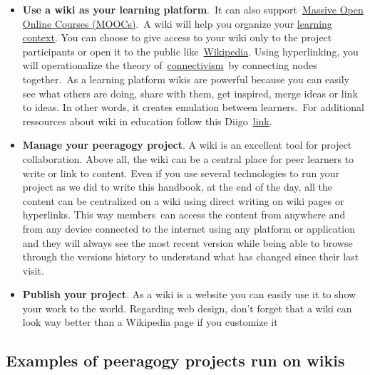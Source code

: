 \begin{itemize}
\item
  \textbf{Use a wiki as your learning platform}.~It can also
  support~\href{http://socialmediaclassroom.com/host/peeragogy/wiki/connectivism-practice-how-organize-a-mooc}{Massive
  Open Online Courses (MOOCs)}.~A wiki will help you organize your
  \href{http://socialmediaclassroom.com/host/peeragogy/wiki/organizing-a-learning-context}{learning
  context}. You can choose to give access to your wiki only to the
  project participants or open it to the public
  like~\href{http://www.wikipedia.org/}{Wikipedia}. Using hyperlinking,
  you will operationalize the theory
  of~\href{http://en.wikipedia.org/wiki/Connectivism}{connectivism}~by
  connecting nodes together.~As a learning platform wikis are powerful
  because you can easily see what others are doing, share with them, get
  inspired, merge ideas or link to ideas. In other words, it creates
  emulation between learners.~For additional ressources about wiki in
  education follow this
  Diigo~\href{http://www.diigo.com/user/regisb/wiki\%20education}{link}.
\end{itemize}

\begin{itemize}
\item
  \textbf{Manage your peeragogy project}. A wiki is an excellent tool
  for project collaboration. Above all, the wiki can be a central place
  for peer learners to write or link to content. Even if you use several
  technologies to run your project as we did to write this handbook, at
  the end of the day, all the content can be centralized on a wiki using
  direct writing on wiki pages or hyperlinks. This way members~can
  access the content from anywhere and from any device connected to the
  internet using any platform or application and they will always see
  the most recent version while being able to browse through the
  versions history to understand what has changed since their last
  visit.
\end{itemize}

\begin{itemize}
\itemsep1pt\parskip0pt
\item
  \textbf{Publish your project}. As a wiki is a website you can easily
  use it to show your work to the world. Regarding web design, don't
  forget that a wiki can look way better than a Wikipedia page if you
  customize it
\end{itemize}

\subsection{Examples of peeragogy projects run on wikis}

